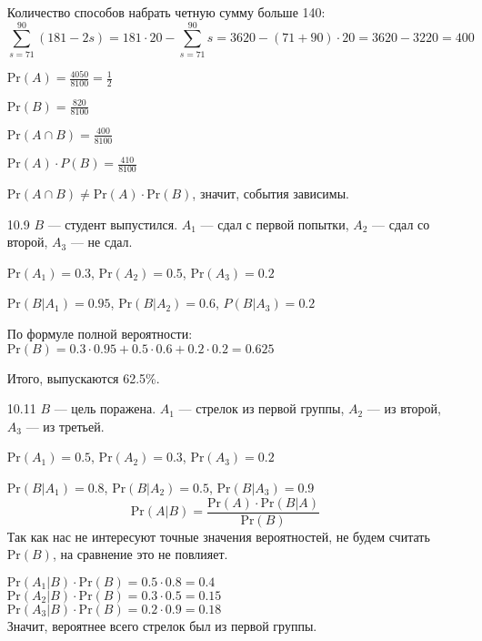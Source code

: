\documentclass[10pt]{article}
\renewcommand{\P}{\text{Pr}}
\begin{document}
\begin{enumerate}
	Количество способов набрать четную сумму больше 140:
	$$\sum_{s=71}^{90} (181 - 2s) = 181 \cdot 20 - \sum_{s=71}^{90} s = 3620 - (71+90)\cdot 20 = 3620 - 3220 = 400$$
	
	$\P(A) = \frac{4050}{8100} = \frac{1}{2}$
	
	$\P(B) = \frac{820}{8100}$
	
	$\P(A \cap B) = \frac{400}{8100}$
	
	$\P(A) \cdot P(B) = \frac{410}{8100}$
	
	$\P(A \cap B) \not = \P(A) \cdot \P(B)$, значит, события зависимы.
	
	\item[10.9] $B$ --- студент выпустился. $A_1$ --- сдал с первой попытки, $A_2$ --- сдал со второй, $A_3$ --- не сдал.
	
	$\P(A_1) = 0.3$, $\P(A_2) = 0.5$, $\P(A_3) = 0.2$
	
	$\P(B|A_1) = 0.95$, $\P(B|A_2) = 0.6$, $P(B|A_3)=0.2$
	
	По формуле полной вероятности:\\
	$\P(B) = 0.3 \cdot 0.95 + 0.5 \cdot 0.6 + 0.2 \cdot 0.2 = 0.625$
	
	Итого, выпускаются 62.5\%.
	
	\item[10.11] $B$ --- цель поражена. $A_1$ --- стрелок из первой группы, $A_2$ --- из второй, $A_3$ --- из третьей.
	
	$\P(A_1) = 0.5$, $\P(A_2) = 0.3$, $\P(A_3) = 0.2$
	
	$\P(B|A_1) = 0.8$, $\P(B|A_2) = 0.5$, $\P(B | A_3) = 0.9$
	$$\P(A|B) = \frac{\P(A) \cdot \P(B|A)}{\P(B)}$$
	Так как нас не интересуют точные значения вероятностей, не будем считать $\P(B)$, на сравнение это не повлияет.
	
	$\P(A_1|B) \cdot \P(B) = 0.5 \cdot 0.8 = 0.4$\\
	$\P(A_2|B) \cdot \P(B) = 0.3 \cdot 0.5 = 0.15$\\
	$\P(A_3|B) \cdot \P(B) = 0.2 \cdot 0.9 = 0.18$	\\
	
	Значит, вероятнее всего стрелок был из первой группы.
\end{enumerate}
\end{document}
